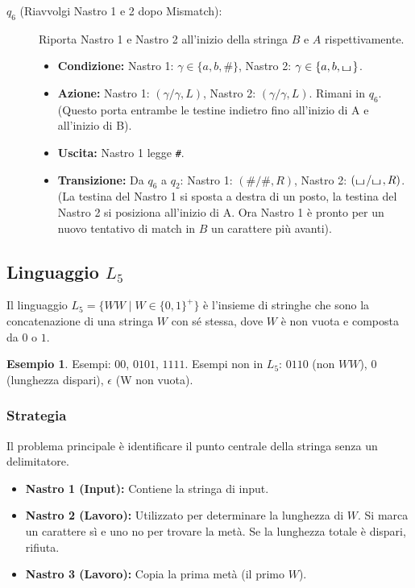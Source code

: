 \documentclass[a4paper]{article}
\theoremstyle{definition} %
\newtheorem{example}{Esempio}
\newcommand{\blankS}{\ensuremath{\raisebox{-0.15ex}{\scalebox{1.3}[0.7]{$\sqcup$}}\mkern2mu}}
\begin{document}
\begin{description}
    \item[$q_6$ (Riavvolgi Nastro 1 e 2 dopo Mismatch):] Riporta Nastro 1 e Nastro 2 all'inizio della stringa $B$ e $A$ rispettivamente.
    \begin{itemize}
        \item \textbf{Condizione:} Nastro 1: $\gamma \in \{a,b,\#\}$, Nastro 2: $\gamma \in \{a,b,\blankS\}$.
        \item \textbf{Azione:} Nastro 1: $(\gamma/\gamma, L)$, Nastro 2: $(\gamma/\gamma, L)$. Rimani in $q_6$. (Questo porta entrambe le testine indietro fino all'inizio di A e all'inizio di B).
        \item \textbf{Uscita:} Nastro 1 legge \texttt{\#}.
        \item \textbf{Transizione:} Da $q_6$ a $q_2$: Nastro 1: $(\#/\#, R)$, Nastro 2: $(\blankS/\blankS, R)$. (La testina del Nastro 1 si sposta a destra di un posto, la testina del Nastro 2 si posiziona all'inizio di A. Ora Nastro 1 è pronto per un nuovo tentativo di match in $B$ un carattere più avanti).
    \end{itemize}
\end{description}

\subsection{Linguaggio $L_5$}
Il linguaggio $L_5 = \{WW \mid W \in \{0,1\}^+\}$ è l'insieme di stringhe che sono la concatenazione di una stringa $W$ con sé stessa, dove $W$ è non vuota e composta da $0$ o $1$.
\begin{example}
Esempi: $00$, $0101$, $1111$.
Esempi non in $L_5$: $0110$ (non $WW$), $0$ (lunghezza dispari), $\epsilon$ (W non vuota).
\end{example}

\subsubsection{Strategia}
Il problema principale è identificare il punto centrale della stringa senza un delimitatore.
\begin{itemize}
    \item \textbf{Nastro 1 (Input):} Contiene la stringa di input.
    \item \textbf{Nastro 2 (Lavoro):} Utilizzato per determinare la lunghezza di $W$. Si marca un carattere sì e uno no per trovare la metà. Se la lunghezza totale è dispari, rifiuta.
    \item \textbf{Nastro 3 (Lavoro):} Copia la prima metà (il primo $W$).
\end{itemize}
\end{document}
